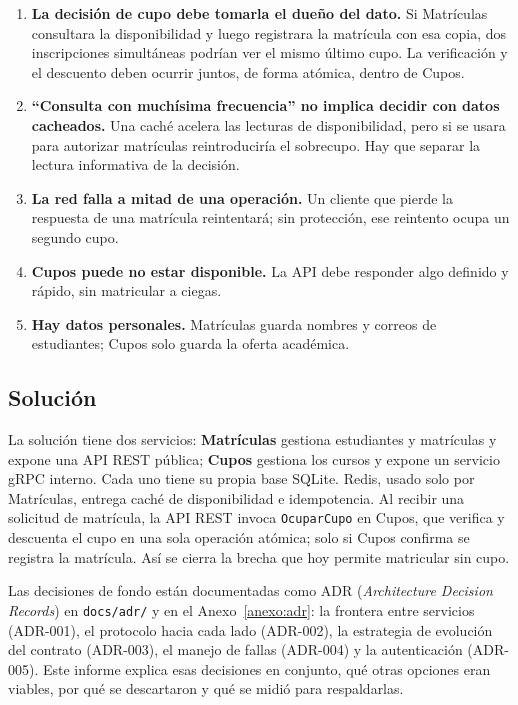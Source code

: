 \documentclass[11pt,spanish]{article}
\begin{document}
\begin{enumerate}
    \item \textbf{La decisión de cupo debe tomarla el dueño del dato.} Si Matrículas consultara la disponibilidad y luego registrara la matrícula con esa copia, dos inscripciones simultáneas podrían ver el mismo último cupo. La verificación y el descuento deben ocurrir juntos, de forma atómica, dentro de Cupos.
    \item \textbf{``Consulta con muchísima frecuencia'' no implica decidir con datos cacheados.} Una caché acelera las lecturas de disponibilidad, pero si se usara para autorizar matrículas reintroduciría el sobrecupo. Hay que separar la lectura informativa de la decisión.
    \item \textbf{La red falla a mitad de una operación.} Un cliente que pierde la respuesta de una matrícula reintentará; sin protección, ese reintento ocupa un segundo cupo.
    \item \textbf{Cupos puede no estar disponible.} La API debe responder algo definido y rápido, sin matricular a ciegas.
    \item \textbf{Hay datos personales.} Matrículas guarda nombres y correos de estudiantes; Cupos solo guarda la oferta académica.
\end{enumerate}

\subsection{Solución}

La solución tiene dos servicios: \textbf{Matrículas} gestiona estudiantes y matrículas y expone una API REST pública; \textbf{Cupos} gestiona los cursos y expone un servicio gRPC interno. Cada uno tiene su propia base SQLite. Redis, usado solo por Matrículas, entrega caché de disponibilidad e idempotencia. Al recibir una solicitud de matrícula, la API REST invoca \texttt{OcuparCupo} en Cupos, que verifica y descuenta el cupo en una sola operación atómica; solo si Cupos confirma se registra la matrícula. Así se cierra la brecha que hoy permite matricular sin cupo.

Las decisiones de fondo están documentadas como ADR (\emph{Architecture Decision Records}) en \texttt{docs/adr/} y en el Anexo~\ref{anexo:adr}: la frontera entre servicios (ADR-001), el protocolo hacia cada lado (ADR-002), la estrategia de evolución del contrato (ADR-003), el manejo de fallas (ADR-004) y la autenticación (ADR-005). Este informe explica esas decisiones en conjunto, qué otras opciones eran viables, por qué se descartaron y qué se midió para respaldarlas.
\end{document}
